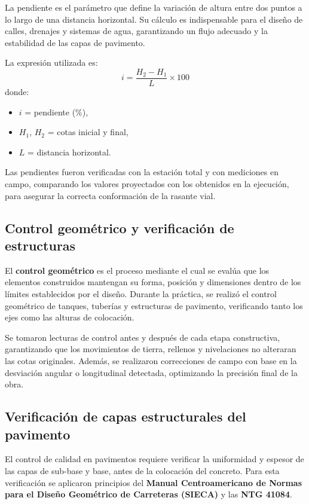 \documentclass[12pt]{article}
\begin{document}
	La pendiente es el parámetro que define la variación de altura entre dos puntos a lo largo de una distancia horizontal.  
	Su cálculo es indispensable para el diseño de calles, drenajes y sistemas de agua, garantizando un flujo adecuado y la estabilidad de las capas de pavimento.
	
	La expresión utilizada es:
	\[
	i = \frac{H_2 - H_1}{L} \times 100
	\]
	donde:
	\begin{itemize}
		\item $i$ = pendiente (\%),
		\item $H_1$, $H_2$ = cotas inicial y final,
		\item $L$ = distancia horizontal.
	\end{itemize}
	
	Las pendientes fueron verificadas con la estación total y con mediciones en campo, comparando los valores proyectados con los obtenidos en la ejecución, para asegurar la correcta conformación de la rasante vial.
	
	\subsection{Control geométrico y verificación de estructuras}
	
	El \textbf{control geométrico} es el proceso mediante el cual se evalúa que los elementos construidos mantengan su forma, posición y dimensiones dentro de los límites establecidos por el diseño.  
	Durante la práctica, se realizó el control geométrico de tanques, tuberías y estructuras de pavimento, verificando tanto los ejes como las alturas de colocación.
	
	Se tomaron lecturas de control antes y después de cada etapa constructiva, garantizando que los movimientos de tierra, rellenos y nivelaciones no alteraran las cotas originales.  
	Además, se realizaron correcciones de campo con base en la desviación angular o longitudinal detectada, optimizando la precisión final de la obra.
	
	\subsection{Verificación de capas estructurales del pavimento}
	
	El control de calidad en pavimentos requiere verificar la uniformidad y espesor de las capas de sub-base y base, antes de la colocación del concreto.  
	Para esta verificación se aplicaron principios del \textbf{Manual Centroamericano de Normas para el Diseño Geométrico de Carreteras (SIECA)} y las \textbf{NTG 41084}.
	
\end{document}
